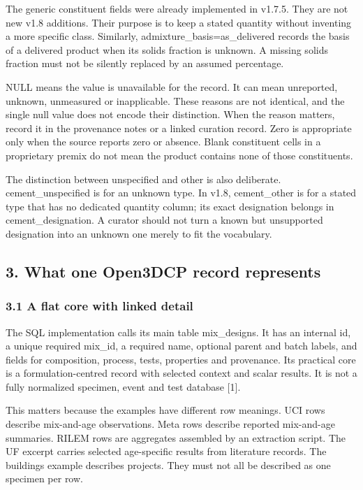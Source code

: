 \documentclass[
  american,
  11pt,
  letterpaper,
]{article}
\newcounter{none} %
\renewcommand{\texttt}[1]{{\ttfamily\fontsize{9.5}{11}\selectfont\hyphenchar\font=-1 #1}}
\begin{document}
The generic constituent fields were already implemented in v1.7.5. They
are not new v1.8 additions. Their purpose is to keep a stated quantity
without inventing a more specific class. Similarly,
\texttt{admixture\_basis=as\_delivered} records the basis of a delivered
product when its solids fraction is unknown. A missing solids fraction
must not be silently replaced by an assumed percentage.

\texttt{NULL} means the value is unavailable for the record. It can mean
unreported, unknown, unmeasured or inapplicable. These reasons are not
identical, and the single null value does not encode their distinction.
When the reason matters, record it in the provenance notes or a linked
curation record. Zero is appropriate only when the source reports zero
or absence. Blank constituent cells in a proprietary premix do not mean
the product contains none of those constituents.

The distinction between unspecified and other is also deliberate.
\texttt{cement\_unspecified} is for an unknown type. In v1.8,
\texttt{cement\_other} is for a stated type that has no dedicated
quantity column; its exact designation belongs in
\texttt{cement\_designation}. A curator should not turn a known but
unsupported designation into an unknown one merely to fit the
vocabulary.

\subsection{3. What one Open3DCP record
represents}\label{what-one-open3dcp-record-represents}

\subsubsection{3.1 A flat core with linked
detail}\label{a-flat-core-with-linked-detail}

The SQL implementation calls its main table \texttt{mix\_designs}. It
has an internal \texttt{id}, a unique required \texttt{mix\_id}, a
required \texttt{name}, optional parent and batch labels, and fields for
composition, process, tests, properties and provenance. Its practical
core is a formulation-centred record with selected context and scalar
results. It is not a fully normalized specimen, event and test database
{[}1{]}.

This matters because the examples have different row meanings. UCI rows
describe mix-and-age observations. Meta rows describe reported
mix-and-age summaries. RILEM rows are aggregates assembled by an
extraction script. The UF excerpt carries selected age-specific results
from literature records. The buildings example describes projects. They
must not all be described as one specimen per row.
\end{document}
